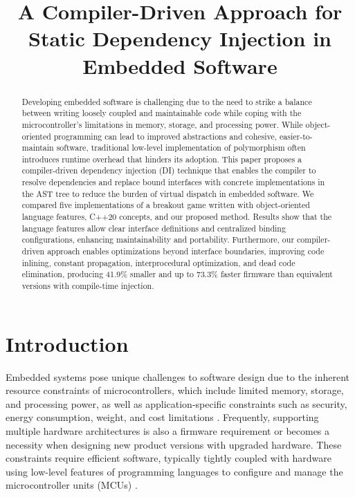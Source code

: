 \documentclass[10pt,sigplan,screen,anonymous]{acmart}
\begin{document}
\title{A Compiler-Driven Approach for Static Dependency Injection in Embedded Software}


\begin{abstract}
Developing embedded software is challenging due to the need to strike a balance between writing loosely coupled and maintainable code while coping with the microcontroller's limitations in memory, storage, and processing power. While object-oriented programming can lead to improved abstractions and cohesive, easier-to-maintain software, traditional low-level implementation of polymorphism often introduces runtime overhead that hinders its adoption. This paper proposes a compiler-driven dependency injection (DI) technique that enables the compiler to resolve dependencies and replace bound interfaces with concrete implementations in the AST tree to reduce the burden of virtual dispatch in embedded software. We compared five implementations of a breakout game written with object-oriented language features, C++20 concepts, and our proposed method. Results show that the language features allow clear interface definitions and centralized binding configurations, enhancing maintainability and portability. Furthermore, our compiler-driven approach enables optimizations beyond interface boundaries, improving code inlining, constant propagation, interprocedural optimization, and dead code elimination, producing 41.9\% smaller and up to 73.3\% faster firmware than equivalent versions with compile-time injection.
\end{abstract}


\maketitle

\section{Introduction}

Embedded systems pose unique challenges to software design due to the inherent resource constraints of microcontrollers, which include limited memory, storage, and processing power, as well as application-specific constraints such as security, energy consumption, weight, and cost limitations \cite{buttazzo2006}. Frequently, supporting multiple hardware architectures is also a firmware requirement or becomes a necessity when designing new product versions with upgraded hardware. These constraints require efficient software, typically tightly coupled with hardware using low-level features of programming languages to configure and manage the microcontroller units (MCUs) \cite{varoumas2023}.
\end{document}
